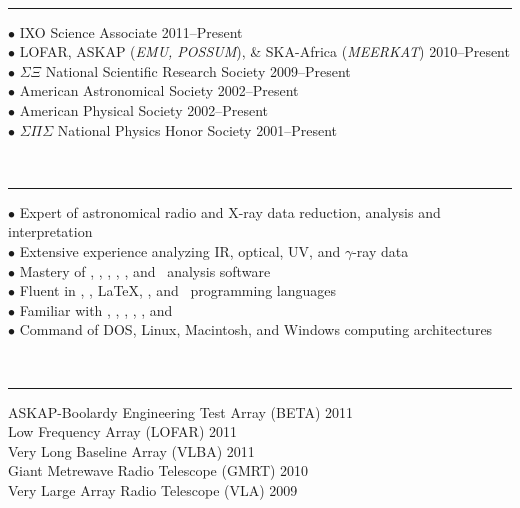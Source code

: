 \documentclass[12pt]{cv}
\begin{document}
{\large{}}\vspace{-0.3cm}\\
\rule{\linewidth}{0.5pt}
{\scriptsize{$\bullet$}} IXO Science Associate \hfill 2011--Present\\
{\scriptsize{$\bullet$}} LOFAR, ASKAP ({\it{EMU, POSSUM}}), \& SKA-Africa ({\it{MEERKAT}}) \hfill 2010--Present\\
{\scriptsize{$\bullet$}} $\Sigma \Xi$ National Scientific Research Society \hfill 2009--Present\\
{\scriptsize{$\bullet$}} American Astronomical Society \hfill 2002--Present\\
{\scriptsize{$\bullet$}} American Physical Society \hfill 2002--Present\\
{\scriptsize{$\bullet$}} $\Sigma \Pi \Sigma$ National Physics Honor Society \hfill 2001--Present

{\large{}}\vspace{-0.3cm}\\
\rule{\linewidth}{0.5pt}
{\scriptsize{$\bullet$}} Expert of astronomical radio and X-ray data reduction, analysis and interpretation\\
{\scriptsize{$\bullet$}} Extensive experience analyzing IR, optical, UV, and $\gamma$-ray data\\
{\scriptsize{$\bullet$}} Mastery of \aips, \casa, \ciao, \iraf, \osa, and \sas\ analysis software\\
{\scriptsize{$\bullet$}} Fluent in \html, \idl, \LaTeX, \perl, and \python\ programming languages\\
{\scriptsize{$\bullet$}} Familiar with \clang, \fortran, \meq, \mysql, \supmo, and \tickle\\
{\scriptsize{$\bullet$}} Command of DOS, Linux, Macintosh, and Windows computing architectures

{\large{}}\vspace{-0.3cm}\\
\rule{\linewidth}{0.5pt}
ASKAP-Boolardy Engineering Test Array (BETA) \hfill 2011\\
Low Frequency Array (LOFAR) \hfill 2011\\
Very Long Baseline Array (VLBA) \hfill 2011\\
Giant Metrewave Radio Telescope (GMRT) \hfill 2010\\
Very Large Array Radio Telescope (VLA) \hfill 2009
\end{document}
